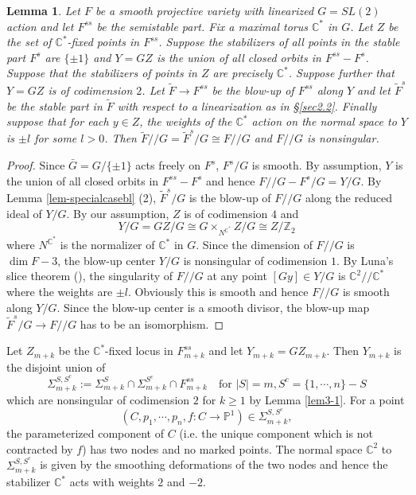 \documentclass[10pt]{amsart}
\newtheorem{lemma}[theorem]{Lemma}
\theoremstyle{definition}
\newcommand{\PP}{\mathbb{P}}
\newcommand{\CC}{\mathbb{C}}
\newcommand{\ZZ}{\mathbb{Z}}
\def\git{/\!/ }
\begin{document}
\begin{lemma}\label{lem4-3}
Let $F$ be a smooth projective variety with linearized $G=SL(2)$
action and let $F^{ss}$ be the semistable part. Fix a maximal
torus $\CC^*$ in $G$. Let $Z$ be the set of $\CC^*$-fixed points
in $F^{ss}$. Suppose the stabilizers of all points in the stable
part $F^{s}$ are $\{\pm 1\}$ and $Y=GZ$ is the union of all closed
orbits in $F^{ss}-F^s$. Suppose that the stabilizers of points in
$Z$ are precisely $\CC^*$. Suppose further that $Y=GZ$ is of
codimension $2$. Let $\tilde{F}\to F^{ss}$ be the blow-up of
$F^{ss}$ along $Y$ and let $\tilde{F}^s$ be the stable part in
$\tilde{F}$ with respect to a linearization as in \S\ref{sec2.2}.
Finally suppose that for each $y\in Z$, the weights of the $\CC^*$
action on the normal space to $Y$ is $\pm l$ for some $l>0$. Then
$\tilde{F}\git G=\tilde{F}^s/G\cong F\git G$ and $F\git G$ is
nonsingular.
\end{lemma}
\begin{proof}
Since $\bar G=G/\{\pm 1\}$ acts freely on $F^s$, $F^s/G$ is
smooth. By assumption, $Y$ is the union of all closed orbits in
$F^{ss}-F^s$ and hence $F\git G-F^s/G=Y/G$. By Lemma
\ref{lem-specialcasebl} (2), $\tilde{F}^s/G$ is the blow-up of
$F\git G$ along the reduced ideal of $Y/G$. By our assumption, $Z$
is of codimension $4$ and
$$Y/G=GZ/G\cong G\times _{N^{\CC^*}}Z/G\cong Z/\ZZ_2$$
where $N^{\CC^*}$ is the normalizer of $\CC^*$ in $G$. Since the
dimension of $F\git G$ is $\dim F-3$, the blow-up center $Y/G$ is
nonsingular of codimension $1$. By Luna's slice theorem
(\cite[Appendix 1.D]{MFK}), the singularity of $F\git G$ at any
point $[Gy]\in Y/G$ is $\CC^2\git \CC^*$ where the weights are
$\pm l$. Obviously this is smooth and hence $F\git G$ is smooth
along $Y/G$. Since the blow-up center is a smooth divisor, the
blow-up map $\tilde{F}^s/G\to F\git G$ has to be an isomorphism.
\end{proof}

Let $Z_{m+k}$ be the $\CC^*$-fixed locus in $F_{m+k}^{ss}$ and let
$Y_{m+k}=GZ_{m+k}$. Then $Y_{m+k}$ is the disjoint union of
$$\Sigma_{m+k}^{S,S^c}:=\Sigma_{m+k}^S\cap \Sigma_{m+k}^{S^c}\cap
F_{m+k}^{ss} \quad \text{for }|S|=m, S^c=\{1,\cdots,n\}-S $$ which
are nonsingular of codimension $2$ for $k\ge 1$ by Lemma
\ref{lem3-1}. For a point $$(C,p_1,\cdots,p_n,f:C\to\PP^1)\in
\Sigma^{S,S^c}_{m+k},$$ the parameterized component of $C$ (i.e.
the unique component which is not contracted by $f$) has two nodes
and no marked points. The normal space $\CC^2$ to
$\Sigma^{S,S^c}_{m+k}$ is given by the smoothing deformations of
the two nodes and hence the stabilizer $\CC^*$ acts with weights
$2$ and $-2$.
\end{document}
